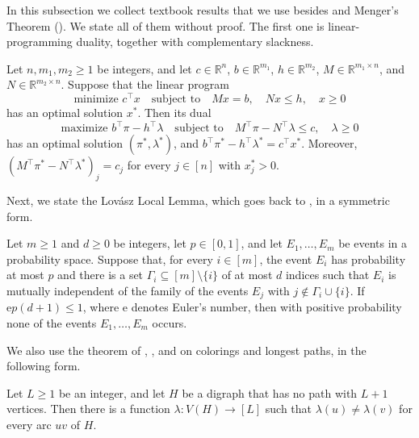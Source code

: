 \documentclass[fontsize=12pt,leading=14pt]{fullpaper}
\begin{document}
In this subsection we collect textbook results that we use besides  and Menger's Theorem ().
We state all of them without proof.
The first one is linear-programming duality, together with complementary slackness.

\begin{proposition}\label{prop:lp}
  Let $n,m_1,m_2\ge1$ be integers, and let $c\in\mathbb R^n$, $b\in\mathbb R^{m_1}$, $h\in\mathbb R^{m_2}$, $M\in\mathbb R^{m_1\times n}$, and $N\in\mathbb R^{m_2\times n}$.
  Suppose that the linear program
  \[
    \text{minimize }c^\top x\quad\text{subject to}\quad Mx=b,\quad Nx\le h,\quad x\ge0
  \]
  has an optimal solution $x^*$.
  Then its dual
  \[
    \text{maximize }b^\top\pi-h^\top\lambda\quad\text{subject to}\quad M^\top\pi-N^\top\lambda\le c,\quad\lambda\ge0
  \]
  has an optimal solution $(\pi^*,\lambda^*)$, and $b^\top\pi^*-h^\top\lambda^*=c^\top x^*$.
  Moreover, $(M^\top\pi^*-N^\top\lambda^*)_j=c_j$ for every $j\in[n]$ with $x^*_j>0$.
\end{proposition}

Next, we state the Lov\'asz Local Lemma, which goes back to \textcite{ErdosLovasz75}, in a symmetric form.

\begin{proposition}\label{prop:lll}
  Let $m\ge1$ and $d\ge0$ be integers, let $p\in[0,1]$, and let $E_1,\dots,E_m$ be events in a probability space.
  Suppose that, for every $i\in[m]$, the event $E_i$ has probability at most $p$ and there is a set $\Gamma_i\subseteq[m]\setminus\{i\}$ of at most $d$ indices such that $E_i$ is mutually independent of the family of the events $E_j$ with $j\notin\Gamma_i\cup\{i\}$.
  If $\mathrm ep(d+1)\le1$, where $\mathrm e$ denotes Euler's number, then with positive probability none of the events $E_1,\dots,E_m$ occurs.
\end{proposition}

We also use the theorem of \textcite{Gallai68}, \textcite{Roy67}, and \textcite{Vitaver62} on colorings and longest paths, in the following form.

\begin{proposition}\label{prop:grv}
  Let $L\ge1$ be an integer, and let $H$ be a digraph that has no path with $L+1$ vertices.
  Then there is a function $\lambda\colon V(H)\to[L]$ such that $\lambda(u)\ne\lambda(v)$ for every arc $uv$ of $H$.
\end{proposition}
\end{document}
